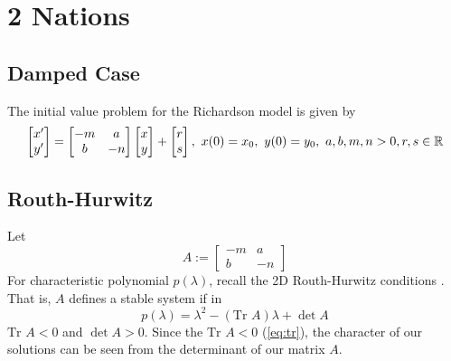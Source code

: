 \documentclass[12pt]{article}
\begin{document}
\section{2 Nations}
\subsection{Damped Case}
The initial value problem for the Richardson model is given by
\begin{equation}\label{eq:richardson}
  \begin{bmatrix}
    x^{\prime}\\
    y^{\prime}
  \end{bmatrix} = 
  \begin{bmatrix}
    -m & a \\
    b & -n 
    \end{bmatrix}
    \begin{bmatrix}
      x \\ 
      y
      \end{bmatrix}+\begin{bmatrix}r \\ s\end{bmatrix},~x(0)=x_0,~y(0)=y_0,~a,b,m,n>0,r,s\in\mathbb{R}
\end{equation}
\subsection{Routh-Hurwitz}
  Let \[
    A:=\begin{bmatrix}
    -m & a \\
    b & -n \end{bmatrix}
  \]
  For characteristic polynomial $p(\lambda)$, recall the 2D Routh-Hurwitz conditions
  \cite[Chap. 3]{MoghadasJaberiDouraki2019}. That is, $A$ defines a stable system if in
  \[
    p(\lambda)=\lambda^2-(\text{Tr }A)\lambda+\det{A}
  \]
  $\text{Tr }A < 0$ and $\det{A}>0$.
  Since the $\text{Tr }A<0$ (\autoref{eq:tr}), the character of our solutions can be seen from the determinant of our matrix $A$.
\end{document}
